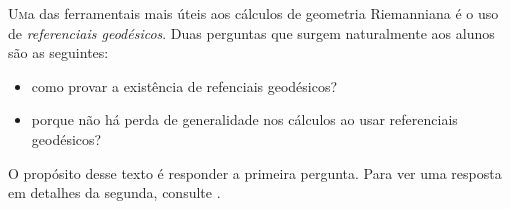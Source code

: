 




\PlaceText{69mm}{38mm}{ \color{gal}\noindent\makebox[\linewidth]{\rule{2\paperwidth}{1pt}}}

\PlaceText{69mm}{14.3mm}{ \color{white}\noindent\makebox[\linewidth]{\rule{2\paperwidth}{11pt}}}

\PlaceText{69mm}{15mm}{ \color{gal}\noindent\makebox[\linewidth]{\rule{2\paperwidth}{1pt}}}

\PlaceText{69mm}{19mm}{ \color{white}\noindent\makebox[\linewidth]{\rule{2\paperwidth}{3pt}}}



\lettrine[nindent=2em,lines=1]{U}ma das ferramentais mais úteis aos cálculos de geometria Riemanniana é o uso de \emph{referenciais geodésicos}. Duas perguntas que surgem naturalmente aos alunos são as seguintes:
\begin{itemize}
\item como provar a existência de refenciais geodésicos?
\item porque não há perda de generalidade nos cálculos ao usar referenciais geodésicos?
\end{itemize}
O propósito desse texto é responder a primeira pergunta. Para ver uma resposta em detalhes da segunda, consulte . 


